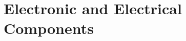 \documentclass[12pt]{book}
\begin{document}
% 
% 
% 
% 
% 
% 
% 
% 
\chapter{Electronic and Electrical Components}
% 
\end{document}
